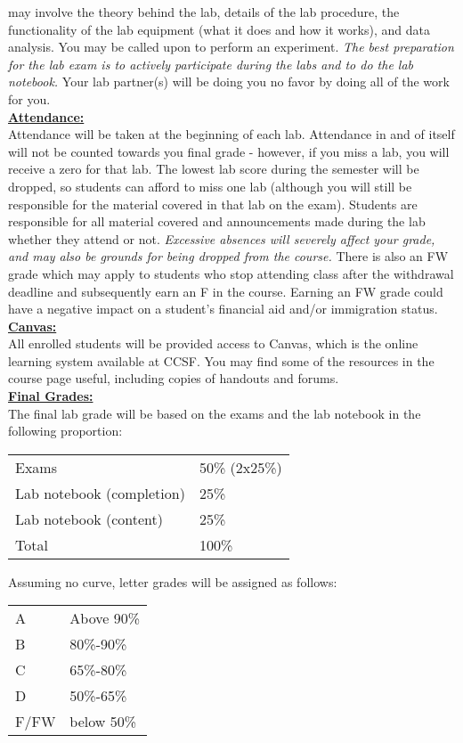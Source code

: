 \documentclass[12pt]{amsart}
\begin{document}
may involve the theory behind the lab, details of the lab procedure, the functionality of the lab equipment (what it does and how it works), and data analysis. You may be called upon
to perform an experiment. \textit{The best preparation for the lab exam is to actively participate during the labs and to do the lab notebook.} Your lab partner(s) will be doing you no favor by doing all of the work for you.\\
\textbf{\underline{Attendance:}}\\
Attendance will be taken at the beginning of each lab. Attendance in and of itself will
not be counted towards you final grade - however, if you miss a lab, you will receive a
zero for that lab. The lowest lab score during the semester will be dropped, so students
can afford to miss one lab (although you will still be responsible for the material covered in that lab on the exam). Students are responsible for all material covered and announcements made during the lab whether they attend or not. \textit{Excessive absences will severely affect your grade, and may also be grounds for being dropped from the course.} There is also an FW grade which may apply to students who stop attending class after the withdrawal deadline and subsequently earn an F in the course. Earning an FW grade could have a negative impact on a student’s financial aid and/or immigration status.\\
\textbf{\underline{Canvas:}}\\
All enrolled students will be provided access to Canvas, which is the online learning
system available at CCSF. You may find some of the resources in the course page useful, including copies of handouts and forums.\\
\textbf{\underline{Final Grades:}}\\
The final lab grade will be based on the exams and the lab notebook in the following proportion:
\begin{center}
\begin{tabular}{l l}
Exams & 50\% (2x25\%)\\
Lab notebook (completion) & 25\%\\
Lab notebook (content) & 25\%\\
\hline
Total & 100\%
\end{tabular}
\end{center}
Assuming no curve, letter grades will be assigned as follows:
\begin{center}
\begin{tabular}{l l}
A & Above 90\%\\
B & 80\%-90\%\\
C & 65\%-80\%\\
D & 50\%-65\%\\
F/FW & below 50\%
\end{tabular}
\end{center}
\end{document}
